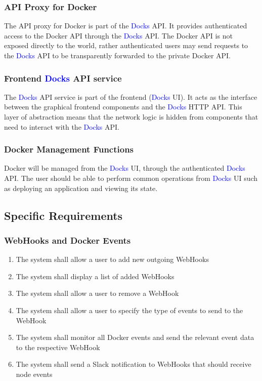 \documentclass[]{article}
\newcommand{\docks}{\textcolor{Blue}{Docks} }
\newcommand{\docker}{Docker }
\begin{document}
\subsubsection{API Proxy for \docker}
The API proxy 	for \docker is part of the \docks API. It provides authenticated
access to the \docker API through the \docks API. The \docker API is not
exposed directly to the world, rather authenticated users may send
requests to the \docks API to be transparently forwarded to the
private \docker API.

\subsubsection{Frontend \docks API service}
The \docks API service is part of the frontend (\docks UI). It acts as the interface
between the graphical frontend components and the \docks HTTP API.
This layer of abstraction means that the network logic is hidden from
components that need to interact with the \docks API.

\subsubsection{\docker Management Functions}
\docker will be managed from the \docks UI, through the authenticated
\docks API. The user should be able to perform common operations
from \docks UI such as deploying an application and viewing its state.

\subsection{Specific Requirements}

\subsubsection{WebHooks and Docker Events}
\begin{enumerate}[label=R1.\arabic*.]
	\item The system shall allow a user to add new outgoing WebHooks
	\item The system shall display a list of added WebHooks
	\item The system shall allow a user to remove a WebHook
	\item The system shall allow a user to specify the type of events to send to the WebHook
	\item The system shall monitor all \docker events and send the relevant event data to the respective WebHook
	\item The system shall send a Slack notification to WebHooks that should receive node events
\end{enumerate}
\end{document}
